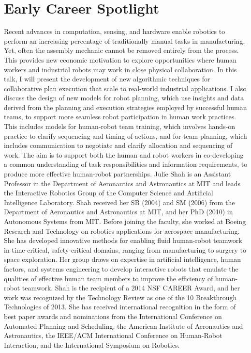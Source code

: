 \chapter{Early Career Spotlight}

{
Recent advances in computation, sensing, and hardware enable robotics to perform an increasing percentage of traditionally manual tasks in manufacturing. Yet, often the assembly mechanic cannot be removed entirely from the process. This provides new economic motivation to explore opportunities where human workers and industrial robots may work in close physical collaboration. In this talk, I will present the development of new algorithmic techniques for collaborative plan execution that scale to real-world industrial applications. I also discuss the design of new models for robot planning, which use insights and data derived from the planning and execution strategies employed by successful human teams, to support more seamless robot participation in human work practices. This includes models for human-robot team training, which involves hands-on practice to clarify sequencing and timing of actions, and for team planning, which includes communication to negotiate and clarify allocation and sequencing of work. The aim is to support both the human and robot workers in co-developing a common understanding of task responsibilities and information requirements, to produce more effective human-robot partnerships.
}{
Julie Shah is an Assistant Professor in the Department of Aeronautics and Astronautics at MIT and leads the Interactive Robotics Group of the Computer Science and Artificial Intelligence Laboratory. Shah received her SB (2004) and SM (2006) from the Department of Aeronautics and Astronautics at MIT, and her PhD (2010) in Autonomous Systems from MIT. Before joining the faculty, she worked at Boeing Research and Technology on robotics applications for aerospace manufacturing. She has developed innovative methods for enabling fluid human-robot teamwork in time-critical, safety-critical domains, ranging from manufacturing to surgery to space exploration. Her group draws on expertise in artificial intelligence, human factors, and systems engineering to develop interactive robots that emulate the qualities of effective human team members to improve the efficiency of human-robot teamwork. Shah is the recipient of a 2014 NSF CAREER Award, and her work was recognized by the Technology Review as one of the 10 Breakthrough Technologies of 2013. She has received international recognition in the form of best paper awards and nominations from the International Conference on Automated Planning and Scheduling, the American Institute of Aeronautics and Astronautics, the IEEE/ACM International Conference on Human-Robot Interaction, and the International Symposium on Robotics.
}


